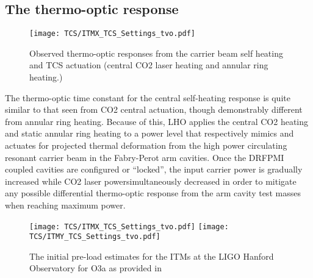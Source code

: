 \subsection{The thermo-optic response}
\begin{figure}[!h]
  \centering
  \begin{subcaptiongroup}
	  \texttt{[image: TCS/ITMX\_TCS\_Settings\_tvo.pdf]}
	  \label{ITMX_TCS}
  \end{subcaptiongroup}
  \captionsetup{subrefformat=parens}
  \hfill
  \caption{Observed thermo-optic responses from the carrier beam self heating and TCS actuation (central CO2 laser heating and annular ring heating.)} 
\label{fig:thermooptic_response}
\end{figure}
The thermo-optic time constant for the central self-heating response is quite similar to that seen from CO2 central actuation, though demonstrably different from annular ring heating. Because of this, LHO applies the central CO2 heating and static annular ring heating to a power level that respectively mimics and actuates for projected thermal deformation from the high power circulating resonant carrier beam in the Fabry-Perot arm cavities. Once the DRFPMI coupled cavities are configured or ``locked'', the input carrier power is gradually increased while CO2 laser powersimultaneously decreased in order to mitigate any possible differential thermo-optic response from the arm cavity test masses when reaching maximum power.
\begin{figure}[!h]
  \centering
  \begin{subcaptiongroup}
	  \texttt{[image: TCS/ITMX\_TCS\_Settings\_tvo.pdf]}
	  \label{ITMX_TCS}
	  \texttt{[image: TCS/ITMY\_TCS\_Settings\_tvo.pdf]}
	  \label{ITMY_TCS}
  \end{subcaptiongroup}
  \captionsetup{subrefformat=parens}
  \hfill
  \caption{The initial pre-load estimates for the ITMs at the LIGO Hanford Observatory for O3a as provided in \cite{tvo}} 
  \label{fig:O3_preload_tvo}
\end{figure}



